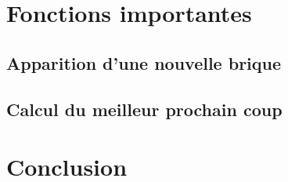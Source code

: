 \documentclass[12pt,a4paper]{article}
\begin{document}
\section{Fonctions importantes}
\subsection{Apparition d'une nouvelle brique}
\subsection{Calcul du meilleur prochain coup}

\section{Conclusion}
\end{document}

